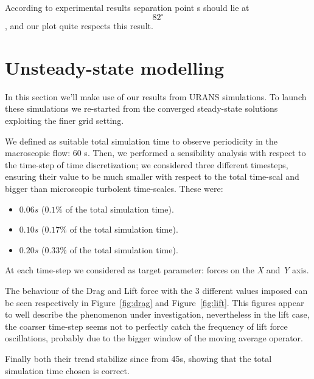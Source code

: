 \documentclass[12pt]{article}
\begin{document}
        According to experimental results separation point s should lie at $$ 82 ^\circ $$, and our plot quite respects this result.

\section{Unsteady-state modelling} \label{sec:URAN}
        In this section we'll make use of our results from URANS simulations. To launch these simulations we re-started from the converged steady-state solutions exploiting the finer grid setting.

        We defined as suitable total simulation time to observe periodicity in the macroscopic flow: 60 s. Then, we performed a sensibility analysis with respect to the time-step of time discretization; we considered three different timesteps, ensuring their value to be much smaller with respect to the total time-scal and bigger than microscopic turbolent time-scales. These were:

        \begin{itemize}
                \item $0.06 s$ ($0.1\%$ of the total simulation time).
                \item $0.10 s$ ($0.17\%$ of the total simulation time).
                \item $0.20 s$ ($0.33\%$ of the total simulation time).
        \end{itemize}
        
        At each time-step we considered as target parameter: forces on the \textit{X} and \textit{Y} axis.

        The behaviour of the Drag and Lift force with the 3 different values imposed can be seen respectively in Figure~\ref{fig:drag} and Figure~\ref{fig:lift}. This figures appear to well describe the phenomenon under investigation, nevertheless in the lift case, the coarser time-step seems not to perfectly catch the frequency of lift force oscillations, probably due to the bigger window of the moving average operator.

        Finally both their trend stabilize since from 45\:s, showing that the total simulation time chosen is correct.
\end{document}
